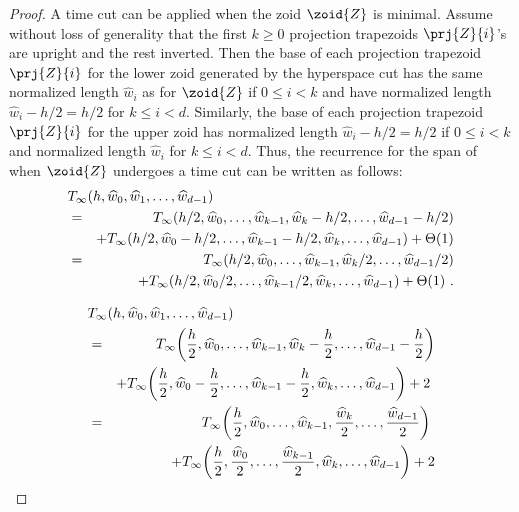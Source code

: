 \begin{proof}
A time cut can be applied when the zoid $\zoid{Z}$ is minimal.  Assume
without loss of generality that the first $k\geq 0$ projection
trapezoids $\prj{Z}{i}$'s are upright and the rest inverted.  Then the
base of each projection trapezoid $\prj{Z}{i}$ for the lower zoid
generated by the hyperspace cut has the same normalized length
$\widehat{w}_i$ as for $\zoid{Z}$ if $0\leq i <k$ and have normalized
length $\widehat{w}_i-h/2=h/2$ for $k\leq i < d$.  Similarly, the base
of each projection trapezoid $\prj{Z}{i}$ for the upper zoid has
normalized length $\widehat{w}_i-h/2=h/2$ if $0\leq i <k$ and
normalized length $\widehat{w}_i$ for $k\leq i < d$.  Thus, the
recurrence for the span of  when $\zoid{Z}$ undergoes a
time cut can be written as follows:
\begin{eqnarray*}
\lefteqn{T_{\infty}(h, \widehat{w}_0, \widehat{w}_1, \ldots, \widehat{w}_{d - 1})}\\
& = & T_{\infty}(h/2, \widehat{w}_0, \ldots, \widehat{w}_{k - 1},
\widehat{w}_{k} - h/2, \ldots, \widehat{w}_{d - 1} - h/2)\\
&  & + T_{\infty}(h/2, \widehat{w}_0 - h/2, \ldots, 
\widehat{w}_{k - 1} - h/2, \widehat{w}_{k}, \ldots, \widehat{w}_{d - 1}) + \Theta(1)\\
& = & T_{\infty}(h/2, \widehat{w}_0, \ldots, \widehat{w}_{k - 1},
\widehat{w}_{k}/2, \ldots, \widehat{w}_{d - 1}/2)\\
&  & + T_{\infty}(h/2, \widehat{w}_0/2, \ldots, \widehat{w}_{k - 1}/2,
\widehat{w}_{k}, \ldots, \widehat{w}_{d - 1}) + \Theta(1)\ .
\end{eqnarray*}

\begin{eqnarray*}
\lefteqn{T_{\infty}(h, \widehat{w}_0, \widehat{w}_1, \ldots, \widehat{w}_{d - 1})}\\
& = & T_{\infty}{\left(\frac{h}{2}, {\widehat{w}}_0, \ldots, {\widehat{w}}_{k - 1},
{\widehat{w}}_{k} - {h \over 2}, \ldots, {\widehat{w}}_{d - 1} - {h \over 2}\right)}\\
& & + T_{\infty}{\left(\frac{h}{2}, {\widehat{w}}_0 - {h \over 2}, \ldots, 
{\widehat{w}}_{k - 1} - {h \over 2}, {\widehat{w}}_{k}, \ldots, {\widehat{w}}_{d - 1}\right)} + 2~\\
& = & T_{\infty}{\left(\frac{h}{2}, {\widehat{w}}_0, \ldots, {\widehat{w}}_{k - 1},
{{\widehat{w}}_{k} \over 2}, \ldots, {{\widehat{w}}_{d - 1} \over 2}\right)}~\\
& & + T_{\infty}{\left(\frac{h}{2}, {{\widehat{w}}_0 \over 2}, \ldots, {{\widehat{w}}_{k - 1} \over 2},
{\widehat{w}}_{k}, \ldots, {\widehat{w}}_{d - 1}\right)} + 2
\end{eqnarray*}


\end{proof}

